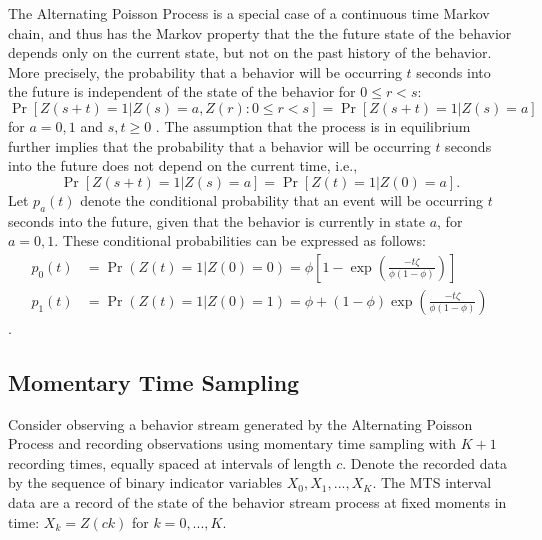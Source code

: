 \documentclass[man, noextraspace, floatsintext]{apa6}\usepackage[]{graphicx}\usepackage[]{color}
\begin{document}
The Alternating Poisson Process is a special case of a continuous time Markov chain, and thus has the Markov property that the the future state of the behavior depends only on the current state, but not on the past history of the behavior. More precisely, the probability that a behavior will be occurring $t$ seconds into the future is independent of the state of the behavior for $0 \leq r < s$: 
\begin{equation}
\label{eq:Markov}
\Pr\left[Z(s + t) = 1 \left| Z(s) = a, Z(r): 0 \leq r < s \right.\right] = \Pr\left[ Z(s + t) = 1 \left| Z(s) = a \right.\right]
\end{equation}
for $a = 0,1$ and $s,t \geq 0$ \citep[Thm. 6.1]{Kulkarni2010modeling}. The assumption that the process is in equilibrium further implies that the probability that a behavior will be occurring $t$ seconds into the future does not depend on the current time, i.e.,  
\begin{equation}
\label{eq:equilibrium}
\Pr\left[Z(s + t) = 1 \left| Z(s) = a\right.\right] = \Pr\left[ Z(t) = 1 \left| Z(0) = a \right.\right].
\end{equation}
Let $p_a(t)$ denote the conditional probability that an event will be occurring $t$ seconds into the future, given that the behavior is currently in state $a$, for $a = 0,1$. These conditional probabilities can be expressed as follows:
\begin{equation}
\begin{aligned}
p_0(t) &= \Pr(Z(t) = 1 | Z(0) = 0) = \phi \left[1 - \exp\left(\frac{- t \zeta}{\phi (1 - \phi)}\right)\right] \\
p_1(t) &= \Pr(Z(t) = 1 | Z(0) = 1) = \phi + (1 - \phi) \exp\left(\frac{- t \zeta}{\phi (1 - \phi)}\right)
\end{aligned}
\end{equation}
\citep[Eq. 6.17]{Kulkarni2010modeling}.

\subsection{Momentary Time Sampling}
\label{subsec:MTS}

Consider observing a behavior stream generated by the Alternating Poisson Process and recording observations using momentary time sampling with $K + 1$ recording times, equally spaced at intervals of length $c$. Denote the recorded data by the sequence of binary indicator variables $X_0,X_1,...,X_K$. The MTS interval data are a record of the state of the behavior stream process at fixed moments in time: $X_k = Z(ck)$ for $k = 0,...,K$. 
\end{document}
